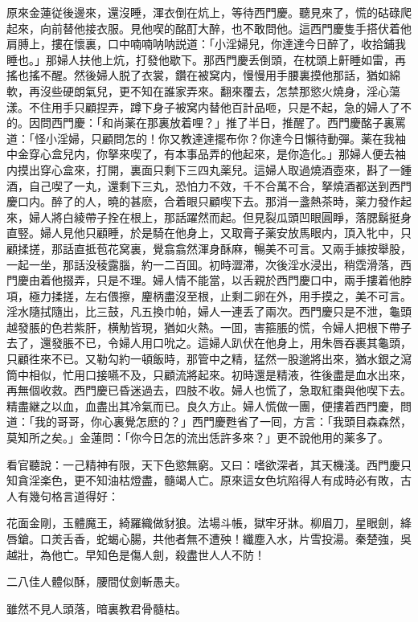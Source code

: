 原來金蓮従後邊來，還沒睡，渾衣倒在炕上，等待西門慶。聽見來了，慌的𥑮碌爬起來，向前替他接衣服。見他喫的酩酊大醉，也不敢問他。這西門慶隻手搭伏着他肩膊上，摟在懷裏，口中喃喃呐呐説道：「小淫婦兒，你達達今日醉了，收拾鋪我睡也。」那婦人扶他上炕，打發他歇下。那西門慶丢倒頭，在枕頭上鼾睡如雷，再搖也搖不醒。然後婦人脱了衣裳，鑽在被窝内，慢慢用手腰裏摸他那話，猶如綿軟，再沒些硬朗氣兒，更不知在誰家弄來。翻來覆去，怎禁那慾火燒身，淫心蕩漾。不住用手只顧捏弄，蹲下身子被窝内替他百計品咂，只是不起，急的婦人了不的。因問西門慶：「和尚薬在那裏放着哩？」推了半日，推醒了。西門慶酩子裏罵道：「怪小淫婦，只顧問怎的！你又教達達擺布你？你達今日懶待動彈。薬在我袖中金穿心盒兒内，你拏來喫了，有本事品弄的他起來，是你造化。」那婦人便去袖内摸出穿心盒來，打開，裏面只剩下三四丸薬兒。這婦人取過燒酒壺來，斟了一鍾酒，自己喫了一丸，還剩下三丸，恐怕力不效，千不合萬不合，拏燒酒都送到西門慶口内。醉了的人，曉的甚麽，合着眼只顧喫下去。那消一盞熱茶時，薬力發作起來，婦人將白綾帶子拴在根上，那話躍然而起。但見裂瓜頭凹眼圓睜，落腮鬍挺身直竪。婦人見他只顧睡，於是騎在他身上，又取膏子薬安放馬眼内，頂入牝中，只顧揉搓，那話直抵苞花窝裏，覺翕翕然渾身酥麻，暢美不可言。又兩手據按舉股，一起一坐，那話没稜露腦，約一二百囬。初時澀滞，次後淫水浸出，稍霑滑落，西門慶由着他掇弄，只是不理。婦人情不能當，以舌親於西門慶口中，兩手摟着他脖項，極力揉搓，左右偎擦，麈柄盡沒至根，止剩二卵在外，用手摸之，美不可言。淫水隨拭隨出，比三鼓，凡五換巾帕，婦人一連丢了兩次。西門慶只是不泄，龜頭越發脹的色若紫肝，横觔皆現，猶如火熱。一囬，害箍脹的慌，令婦人把根下帶子去了，還發脹不已，令婦人用口吮之。這婦人趴伏在他身上，用朱唇吞裹其龜頭，只顧徃來不已。又勒勾約一頓飯時，那管中之精，猛然一股邈將出來，猶水銀之瀉筒中相似，忙用口接嚥不及，只顧流將起來。初時還是精液，徃後盡是血水出來，再無個收救。西門慶已昏迷過去，四肢不收。婦人也慌了，急取紅棗與他喫下去。精盡継之以血，血盡出其冷氣而已。良久方止。婦人慌做一團，便摟着西門慶，問道：「我的哥哥，你心裏覺怎麽的？」西門慶甦省了一囘，方言：「我頭目森森然，莫知所之矣。」金蓮問：「你今日怎的流出恁許多來？」更不說他用的薬多了。

看官聽說：一己精神有限，天下色慾無窮。又曰：嗜欲深者，其天機淺。西門慶只知貪淫楽色，更不知油枯燈盡，髓竭人亡。原來這女色坑陷得人有成時必有敗，古人有幾句格言道得好：

\begin{myquote}
花面金剛，玉體魔王，綺羅織做豺狼。法場斗帳，獄牢牙牀。柳眉刀，星眼劍，絳唇鎗。口羙舌香，蛇蝎心腸，共他者無不遭殃！纖塵入水，片雪投湯。秦楚強，吳越壯，為他亡。早知色是傷人劍，殺盡世人人不防！

二八佳人體似酥，腰間仗劍斬愚夫。

雖然不見人頭落，暗裏教君骨髓枯。
\end{myquote}

